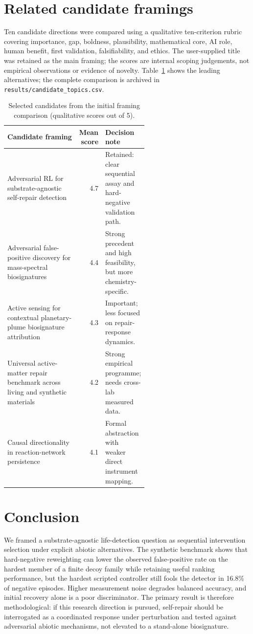 \documentclass[11pt]{article}
\begin{document}
\section{Related candidate framings}
Ten candidate directions were compared using a qualitative ten-criterion rubric covering importance, gap, boldness, plausibility, mathematical core, AI role, human benefit, first validation, falsifiability, and ethics. The user-supplied title was retained as the main framing; the scores are internal scoping judgements, not empirical observations or evidence of novelty. Table~\ref{tab:candidates} shows the leading alternatives; the complete comparison is archived in \texttt{results/candidate\_topics.csv}.

\begin{table}[htbp]
\centering\small
\caption{Selected candidates from the initial framing comparison (qualitative scores out of 5).}
\label{tab:candidates}
\begin{tabularx}{\linewidth}{p{0.57\linewidth}rX}
\toprule
Candidate framing & Mean score & Decision note \\
\midrule
Adversarial RL for substrate-agnostic self-repair detection & 4.7 & Retained: clear sequential assay and hard-negative validation path. \\
Adversarial false-positive discovery for mass-spectral biosignatures & 4.4 & Strong precedent and high feasibility, but more chemistry-specific. \\
Active sensing for contextual planetary-plume biosignature attribution & 4.3 & Important; less focused on repair-response dynamics. \\
Universal active-matter repair benchmark across living and synthetic materials & 4.2 & Strong empirical programme; needs cross-lab measured data. \\
Causal directionality in reaction-network persistence & 4.1 & Formal abstraction with weaker direct instrument mapping. \\
\bottomrule
\end{tabularx}
\end{table}

\section{Conclusion}
We framed a substrate-agnostic life-detection question as sequential intervention selection under explicit abiotic alternatives. The synthetic benchmark shows that hard-negative reweighting can lower the observed false-positive rate on the hardest member of a finite decoy family while retaining useful ranking performance, but the hardest scripted controller still fools the detector in 16.8\% of negative episodes. Higher measurement noise degrades balanced accuracy, and initial recovery alone is a poor discriminator. The primary result is therefore methodological: if this research direction is pursued, self-repair should be interrogated as a coordinated response under perturbation and tested against adversarial abiotic mechanisms, not elevated to a stand-alone biosignature.
\end{document}
